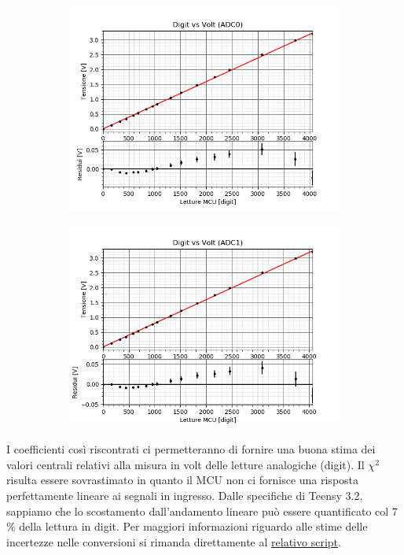 \documentclass{article}[a4paper, oneside, 11pt]
\begin{document}
\begin{figure}[H]
\centering
\begin{subfigure}{.5\textwidth}
	\centering 
 		\includegraphics[scale=0.5]{./digitvsvolt_ADC0_1.png}
	\label{fig: nofilter}
\end{subfigure}%
\begin{subfigure} {.5\textwidth}
	\centering 
		\includegraphics[scale=0.5]{./digitvsvolt_ADC1_1.png}
	\label{fig: filtered}
\end{subfigure}
\end{figure}

I coefficienti così riscontrati ci permetteranno di fornire una buona stima dei valori centrali relativi alla misura in volt delle letture analogiche (digit). Il $\chi^2$ risulta essere sovrastimato in quanto il MCU non ci fornisce una risposta perfettamente lineare ai segnali in ingresso. Dalle specifiche di Teensy 3.2, sappiamo che lo scostamento dall’andamento lineare può essere quantificato col 7 $\%$ della lettura in digit.\newline
Per maggiori informazioni riguardo alle stime delle incertezze nelle conversioni si rimanda direttamente al \href{https://github.com/LucaCiucci/relaz_seme/blob/master/Cartella_fit/funzioni.py}{relativo script}.
\end{document}
